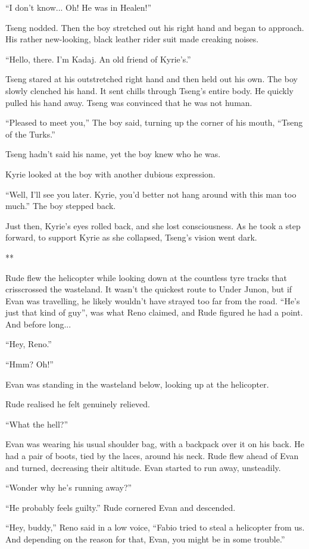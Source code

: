 \documentclass[oneside]{book}
\begin{document}
“I don’t know... Oh! He was in Healen!”

Tseng nodded. Then the boy stretched out his right hand and began to approach. His rather new-looking, black leather rider suit made creaking noises.

“Hello, there. I’m Kadaj. An old friend of Kyrie’s.”

Tseng stared at his outstretched right hand and then held out his own. The boy slowly clenched his hand. It sent chills through Tseng’s entire body. He quickly pulled his hand away. Tseng was convinced that he was not human.

“Pleased to meet you,” The boy said, turning up the corner of his mouth, “Tseng of the Turks.”

Tseng hadn’t said his name, yet the boy knew who he was.

Kyrie looked at the boy with another dubious expression.

“Well, I’ll see you later. Kyrie, you’d better not hang around with this man too much.” The boy stepped back.

Just then, Kyrie’s eyes rolled back, and she lost consciousness. As he took a step forward, to support Kyrie as she collapsed, Tseng’s vision went dark.

**

Rude flew the helicopter while looking down at the countless tyre tracks that crisscrossed the wasteland. It wasn’t the quickest route to Under Junon, but if Evan was travelling, he likely wouldn’t have strayed too far from the road. “He’s just that kind of guy”, was what Reno claimed, and Rude figured he had a point. And before long...

“Hey, Reno.”

“Hmm? Oh!”

Evan was standing in the wasteland below, looking up at the helicopter.

Rude realised he felt genuinely relieved.

“What the hell?”

Evan was wearing his usual shoulder bag, with a backpack over it on his back. He had a pair of boots, tied by the laces, around his neck. Rude flew ahead of Evan and turned, decreasing their altitude. Evan started to run away, unsteadily.

“Wonder why he’s running away?”

“He probably feels guilty.” Rude cornered Evan and descended.

“Hey, buddy,” Reno said in a low voice, “Fabio tried to steal a helicopter from us. And depending on the reason for that, Evan, you might be in some trouble.”
\end{document}
